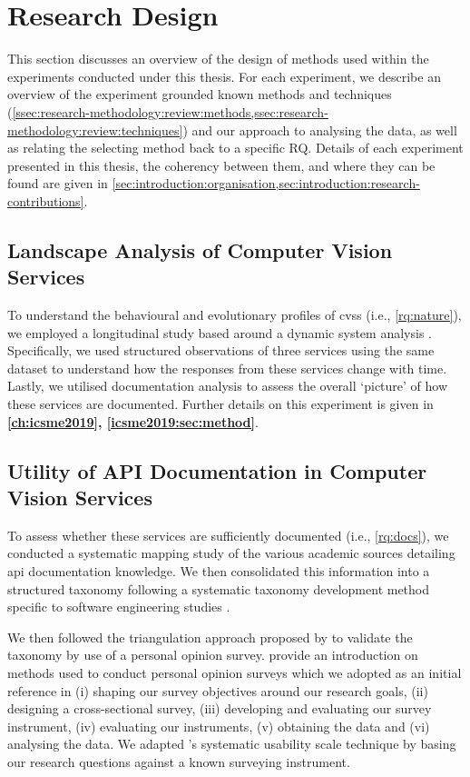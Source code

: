 \section{Research Design}
\label{sec:research-methodology:experiments}

This section discusses an overview of the design of methods used within the experiments conducted under this thesis. For each experiment, we describe an overview of the experiment grounded known methods and techniques (\cref{ssec:research-methodology:review:methods,ssec:research-methodology:review:techniques}) and our approach to analysing the data, as well as relating the selecting method back to a specific RQ. Details of each experiment presented in this thesis, the coherency between them, and where they can be found are given in \cref{sec:introduction:organisation,sec:introduction:research-contributions}.

\subsection{Landscape Analysis of Computer Vision Services}

To understand the behavioural and evolutionary profiles of \glspl{cvs} (i.e., \ref{rq:nature}), we employed a longitudinal study based around a dynamic system analysis \citep{Singer:2007tu}. Specifically, we used structured observations of three services using the same dataset to understand how the responses from these services change with time. Lastly, we utilised documentation analysis to assess the overall `picture' of how these services are documented. Further details on this experiment is given in \textbf{\cref{ch:icsme2019}, \cref{icsme2019:sec:method}}.

\subsection{Utility of API Documentation in Computer Vision Services}

To assess whether these services are sufficiently documented (i.e., \ref{rq:docs}), we conducted a systematic mapping study \citep{Kitchenham:2007dd,Petersen:2008td} of the various academic sources detailing \gls{api} documentation knowledge. We then consolidated this information into a structured taxonomy following a systematic taxonomy development method specific to software engineering studies \citep{Usman:2017hn}.

We then followed the triangulation approach proposed by \citet{Jick:1979el} to validate the taxonomy by use of a personal opinion survey. \citet{Kitchenham:2007ux} provide an introduction on methods used to conduct personal opinion surveys which we adopted as an initial reference in (i) shaping our survey objectives around our research goals, (ii) designing a cross-sectional survey, (iii) developing and evaluating our survey instrument, (iv) evaluating our instruments, (v) obtaining the data and (vi) analysing the data. We adapted \citeauthor{Brooke:1996ua}'s systematic usability scale \citep{Brooke:1996ua} technique by basing our research questions against a known surveying instrument.

